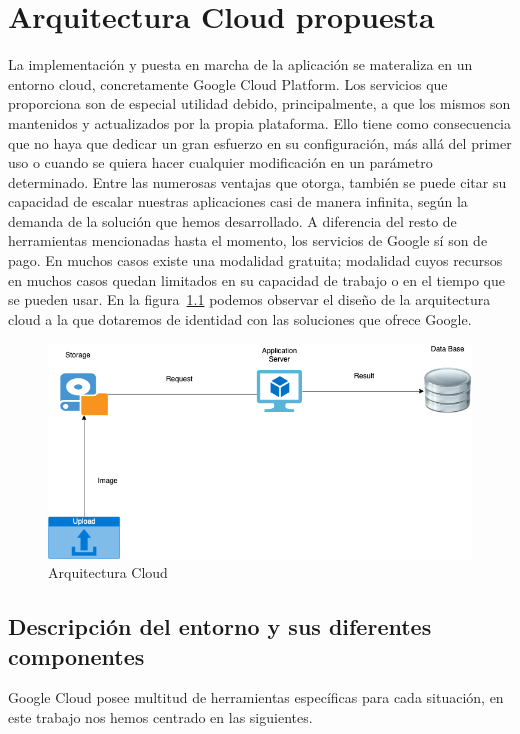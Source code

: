 \cleardoublepage
\mbox{}
\lstset{
language=Python,
basicstyle=\small\sffamily,
numbers=left,
numberstyle=\tiny,
frame=tb,
columns=fullflexible,
showstringspaces=false
}
\chapter{Arquitectura Cloud propuesta}
\label{ch:chapter4}
La implementación y puesta en marcha de la aplicación se materaliza en un entorno cloud, concretamente Google Cloud Platform.
Los servicios que proporciona son de especial utilidad debido, principalmente, a que los mismos son mantenidos y actualizados por la propia plataforma.
Ello tiene como consecuencia que no haya que dedicar un gran esfuerzo en su configuración, más allá del primer uso o cuando se quiera hacer cualquier modificación en un parámetro determinado.
Entre las numerosas ventajas que otorga, también se puede citar su capacidad de escalar nuestras aplicaciones casi de manera infinita, según la demanda de la solución que hemos desarrollado.
A diferencia del resto de herramientas mencionadas hasta el momento, los servicios de Google sí son de pago.
En muchos casos existe una modalidad gratuita;
modalidad cuyos recursos en muchos casos quedan limitados en su capacidad de trabajo o en el tiempo que se pueden usar.
En la figura~\ref{fig:Arquitectura Cloud} podemos observar el diseño de la arquitectura cloud a la que dotaremos de identidad con las soluciones que ofrece Google.

\begin{figure}
    \centering
    \includegraphics[width=1.0\textwidth]{images/chapter4/cloud_architecture.png}
    \caption{Arquitectura Cloud}
    \label{fig:Arquitectura Cloud}
\end{figure}

\section{Descripción del entorno y sus diferentes componentes}\label{sec:descripción-del-entorno-y-sus-diferentes-componentes}
Google Cloud posee multitud de herramientas específicas para cada situación, en este trabajo nos hemos centrado en las siguientes.

